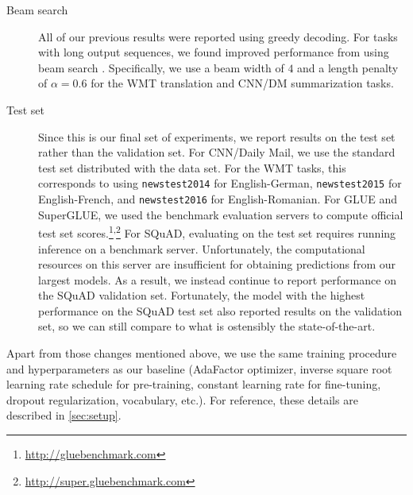 \documentclass[twoside,11pt]{article}
\begin{document}
\begin{description}
\item[Beam search] All of our previous results were reported using greedy decoding.
For tasks with long output sequences, we found improved performance from using beam search \citep{sutskever2014sequence}.
Specifically, we use a beam width of $4$ and a length penalty of $\alpha = 0.6$ \citep{wu2016google} for the WMT translation and CNN/DM summarization tasks.

\item[Test set] Since this is our final set of experiments, we report results on the test set rather than the validation set.
For CNN/Daily Mail, we use the standard test set distributed with the data set.
For the WMT tasks, this corresponds to using \texttt{newstest2014} for English-German, \texttt{newstest2015} for English-French, and \texttt{newstest2016} for English-Romanian.
For GLUE and SuperGLUE, we used the benchmark evaluation servers to compute official test set scores.\footnote{\url{http://gluebenchmark.com}}\textsuperscript{,}\footnote{\url{http://super.gluebenchmark.com}}
For SQuAD, evaluating on the test set requires running inference on a benchmark server.
Unfortunately, the computational resources on this server are insufficient for obtaining predictions from our largest models.
As a result, we instead continue to report performance on the SQuAD validation set.
Fortunately, the model with the highest performance on the SQuAD test set also reported results on the validation set, so we can still compare to what is ostensibly the state-of-the-art.

\end{description}

Apart from those changes mentioned above, we use the same training procedure and hyperparameters as our baseline (AdaFactor optimizer, inverse square root learning rate schedule for pre-training, constant learning rate for fine-tuning, dropout regularization, vocabulary, etc.).
For reference, these details are described in \cref{sec:setup}.
\end{document}
